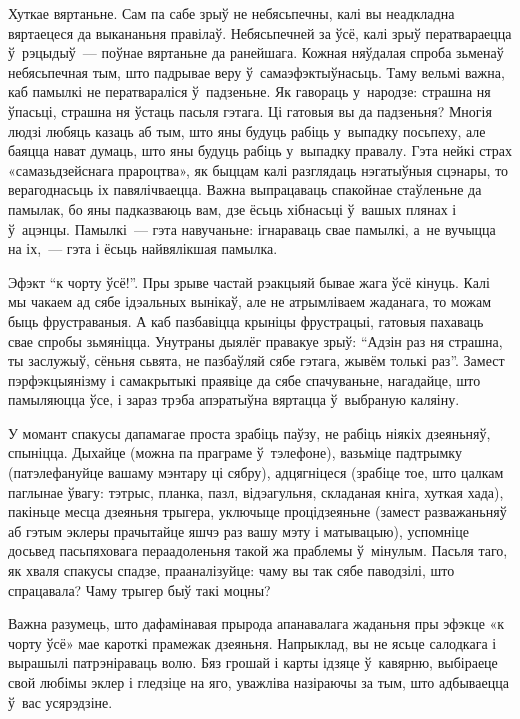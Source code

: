 Хуткае вяртаньне. Сам па сабе зрыў не небясьпечны, калі вы неадкладна вяртаецеся да выкананьня правілаў. Небясьпечней за ўсё, калі зрыў ператвараецца ў~рэцыдыў~--- поўнае вяртаньне да ранейшага. Кожная няўдалая спроба зьменаў небясьпечная тым, што падрывае веру ў~самаэфэктыўнасьць. Таму вельмі важна, каб памылкі не ператвараліся ў~падзеньне. Як гавораць у~народзе: страшна ня ўпасьці, страшна ня ўстаць пасьля гэтага. Ці гатовыя вы да падзеньня? Многія людзі любяць казаць аб тым, што яны будуць рабіць у~выпадку посьпеху, але баяцца нават думаць, што яны будуць рабіць у~выпадку правалу. Гэта нейкі страх «самазьдзейснага прароцтва», як быццам калі разглядаць нэгатыўныя сцэнары, то верагоднасьць іх павялічваецца. Важна выпрацаваць спакойнае стаўленьне да памылак, бо яны падказваюць вам, дзе ёсьць хібнасьці ў~вашых плянах і ў~ацэнцы. Памылкі~--- гэта навучаньне: ігнараваць свае памылкі, а~не вучыцца на іх,~--- гэта і ёсьць найвялікшая памылка.

Эфэкт ``к чорту ўсё!''. Пры зрыве частай рэакцыяй бывае жага ўсё кінуць. Калі мы чакаем ад сябе ідэальных вынікаў, але не атрымліваем жаданага, то можам быць фрустраваныя. А каб пазбавіцца крыніцы фрустрацыі, гатовыя пахаваць свае спробы зьмяніцца. Унутраны дыялёг правакуе зрыў: ``Адзін раз ня страшна, ты заслужыў, сёньня сьвята, не пазбаўляй сябе гэтага, жывём толькі раз''. Замест пэрфэкцыянізму і самакрытыкі праявіце да сябе спачуваньне, нагадайце, што памыляюцца ўсе, і зараз трэба апэратыўна вяртацца ў~выбраную каляіну.

У момант спакусы дапамагае проста зрабіць паўзу, не рабіць ніякіх дзеяньняў, спыніцца. Дыхайце (можна па праграме ў~тэлефоне), вазьміце падтрымку (патэлефануйце вашаму мэнтару ці сябру), адцягніцеся (зрабіце тое, што цалкам паглынае ўвагу: тэтрыс, планка, пазл, відэагульня, складаная кніга, хуткая хада), пакіньце месца дзеяньня трыгера, уключыце процідзеяньне (замест разважаньняў аб гэтым эклеры прачытайце яшчэ раз вашу мэту і матывацыю), успомніце досьвед пасьпяховага пераадоленьня такой жа праблемы ў~мінулым. Пасьля таго, як хваля спакусы спадзе, прааналізуйце: чаму вы так сябе паводзілі, што спрацавала? Чаму трыгер быў такі моцны?

Важна разумець, што дафамінавая прырода апанавалага жаданьня пры эфэкце «к чорту ўсё» мае кароткі прамежак дзеяньня. Напрыклад, вы не ясьце салодкага і вырашылі патрэніраваць волю. Бяз грошай і карты ідзяце ў~кавярню, выбіраеце свой любімы эклер і гледзіце на яго, уважліва назіраючы за тым, што адбываецца ў~вас усярэдзіне.

